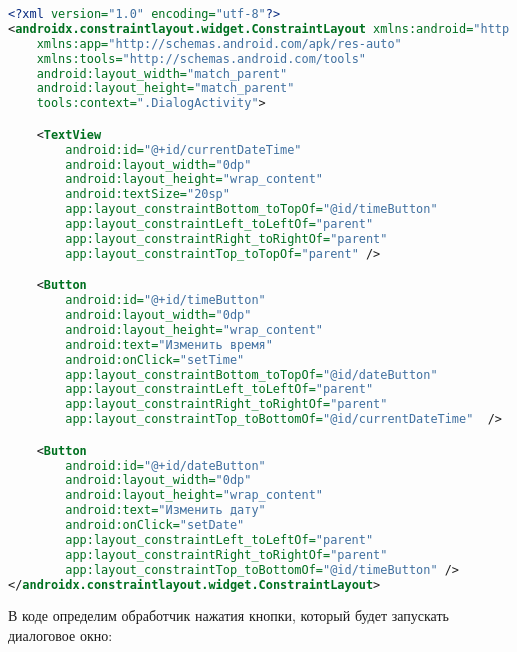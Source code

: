 \begin{lstlisting}[language=XML
	, label=lst:
	]
<?xml version="1.0" encoding="utf-8"?>
<androidx.constraintlayout.widget.ConstraintLayout xmlns:android="http://schemas.android.com/apk/res/android"
    xmlns:app="http://schemas.android.com/apk/res-auto"
    xmlns:tools="http://schemas.android.com/tools"
    android:layout_width="match_parent"
    android:layout_height="match_parent"
    tools:context=".DialogActivity">

    <TextView
        android:id="@+id/currentDateTime"
        android:layout_width="0dp"
        android:layout_height="wrap_content"
        android:textSize="20sp"
        app:layout_constraintBottom_toTopOf="@id/timeButton"
        app:layout_constraintLeft_toLeftOf="parent"
        app:layout_constraintRight_toRightOf="parent"
        app:layout_constraintTop_toTopOf="parent" />

    <Button
        android:id="@+id/timeButton"
        android:layout_width="0dp"
        android:layout_height="wrap_content"
        android:text="Изменить время"
        android:onClick="setTime"
        app:layout_constraintBottom_toTopOf="@id/dateButton"
        app:layout_constraintLeft_toLeftOf="parent"
        app:layout_constraintRight_toRightOf="parent"
        app:layout_constraintTop_toBottomOf="@id/currentDateTime"  />

    <Button
        android:id="@+id/dateButton"
        android:layout_width="0dp"
        android:layout_height="wrap_content"
        android:text="Изменить дату"
        android:onClick="setDate"
        app:layout_constraintLeft_toLeftOf="parent"
        app:layout_constraintRight_toRightOf="parent"
        app:layout_constraintTop_toBottomOf="@id/timeButton" />
</androidx.constraintlayout.widget.ConstraintLayout>
\end{lstlisting}

В коде определим обработчик нажатия кнопки, который будет
запускать диалоговое окно:

